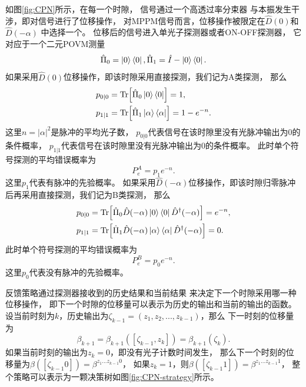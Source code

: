 如图\ref{fig:CPN}所示，在每一个时隙，
信号通过一个高透过率分束器
与本振发生干涉，即对信号进行了位移操作，
对MPPM信号而言，位移操作被限定在$\hat{D}(0)$和$\hat{D}(-\alpha)$
中选择一个。
位移后的信号进入单光子探测器或者ON-OFF探测器，
它对应于一个二元POVM测量
\begin{equation}
\hat{\Pi}_0 = \ket{0}\bra{0}, \hat{\Pi}_1 = \hat{I} - \ket{0}\bra{0}.
\label{eq:ONOFF-POVM}
\end{equation}
如果采用$\hat{D}(0)$位移操作，即该时隙采用直接探测，我们记为A类探测，
那么
\begin{equation}
\begin{split}
p_{0|0} &= \Tr[\hat{\Pi}_0 \ket{0}\bra{0}] = 1,\\
p_{1|1} &= \Tr[\hat{\Pi}_1 \ket{\alpha}\bra{\alpha}] = 1-e^{-n}.
\end{split}
\label{eq:CPN-cond-1}
\end{equation}
这里$n=|\alpha|^2$是脉冲的平均光子数，
$p_{0|0}$代表信号在该时隙里没有光脉冲输出为0的条件概率，
$p_{1|1}$代表信号在该时隙里没有光脉冲输出为0的条件概率。
此时单个符号探测的平均错误概率为
\begin{equation}
P_e^{A} = p_1 e^{-n}.
\label{eq:DD-A-error}
\end{equation}
这里$p_1$代表有脉冲的先验概率。
如果采用$\hat{D}(-\alpha)$位移操作，即该时隙归零脉冲后再采用直接探测，我们记为B类探测，
那么
\begin{equation}
\begin{split}
p_{0|0} &= \Tr[\hat{\Pi}_0 \hat{D}(-\alpha)\ket{0}\bra{0}\hat{D}^\dagger(-\alpha)] = e^{-n},\\
p_{1|1} &= \Tr[\hat{\Pi}_1 \hat{D}(-\alpha)\ket{\alpha}\bra{\alpha}\hat{D}^\dagger(-\alpha)] = 0.
\end{split}
\label{eq:CPN-cond-2}
\end{equation}
此时单个符号探测的平均错误概率为
\begin{equation}
P_e^{B} = p_0 e^{-n}.
\label{eq:DD-B-error}
\end{equation}
这里$p_0$代表没有脉冲的先验概率。



反馈策略通过探测器接收到的历史结果和当前结果
来决定下一个时隙采用哪一种位移操作，
即下一个时隙的位移量可以表示为历史的输出和当前的输出的函数。
设当前时刻为$k$，历史输出为$\zeta_{k-1}=(z_1,z_2,...,z_{k-1})$，那么
下一时刻的位移量为
\begin{equation}
\beta_{k+1} = \beta_{k+1}([\zeta_{k-1} , z_k]) = \beta_{k+1}(\zeta_k).
\end{equation}
如果当前时刻的输出为$z_k=0$，即没有光子计数时间发生，
那么下一个时刻的位移量为$\beta([\zeta_{k-1} 0]) = \beta^{z_1...z_{k-1}0}$，
如果$z_k=1$，则$\beta([\zeta_{k-1} 1]) = \beta^{z_1...z_{k-1}1}$，
整个策略可以表示为一颗决策树如图\ref{fig:CPN-strategy}所示。



